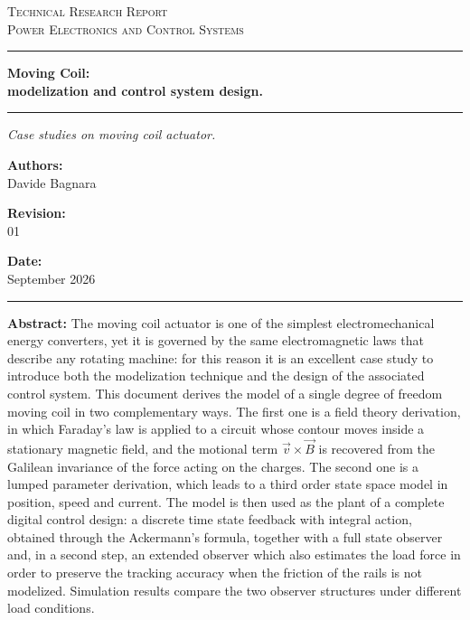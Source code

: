 \documentclass[12pt,a4paper]{scrartcl}
\newcommand{\DocCategory}{Technical Research Report}
\newcommand{\DocField}{Power Electronics and Control Systems}
\newcommand{\DocTitle}{%
	{\fontsize{20}{24}\selectfont\bfseries Moving Coil:} \\[16pt]
	{\fontsize{16}{20}\selectfont\bfseries modelization and control system design.}
}
\newcommand{\DocSubtitle}{%
	Case studies on moving coil actuator.
}
\newcommand{\DocAuthor}{Davide Bagnara}
\newcommand{\DocRevision}{01}
\newcommand{\DocDate}{September 2026}
\newcommand{\DocAbstract}{%
	The moving coil actuator is one of the simplest electromechanical energy converters, yet it is governed by the same electromagnetic laws that describe any rotating machine: for this reason it is an excellent case study to introduce both the modelization technique and the design of the associated control system. This document derives the model of a single degree of freedom moving coil in two complementary ways. The first one is a field theory derivation, in which Faraday's law is applied to a circuit whose contour moves inside a stationary magnetic field, and the motional term $\vec{v}\times\vec{B}$ is recovered from the Galilean invariance of the force acting on the charges. The second one is a lumped parameter derivation, which leads to a third order state space model in position, speed and current. The model is then used as the plant of a complete digital control design: a discrete time state feedback with integral action, obtained through the Ackermann's formula, together with a full state observer and, in a second step, an extended observer which also estimates the load force in order to preserve the tracking accuracy when the friction of the rails is not modelized. Simulation results compare the two observer structures under different load conditions.
}
\begin{document}
	\titlepage
	\begin{center}
		{\Large\scshape \DocCategory}\\[8pt]
		{\large\scshape \DocField}
	\end{center}

	\vspace{30pt}
	\noindent\rule{\linewidth}{0.8pt}

	\begin{center}
		\DocTitle
	\end{center}

	\vspace{4pt}
	\noindent\rule{\linewidth}{2.2pt}

	\begin{center}
		\begin{onehalfspace}
			{\large\itshape \DocSubtitle}
		\end{onehalfspace}
	\end{center}

	\vspace{30pt}

	\noindent
	\begin{minipage}[t]{0.44\linewidth}
		\textbf{Authors:}\\[2pt]
		\DocAuthor
	\end{minipage}%
	\hfill
	\begin{minipage}[t]{0.22\linewidth}
		\centering
		\textbf{Revision:}\\[2pt]
		\DocRevision
	\end{minipage}%
	\hfill
	\begin{minipage}[t]{0.30\linewidth}
		\raggedleft
		\textbf{Date:}\\[2pt]
		\DocDate
	\end{minipage}

	\vspace{10pt}
	\noindent\rule{\linewidth}{0.8pt}

	\vspace{24pt}

	\begin{center}
		\begin{minipage}{0.88\linewidth}
			\footnotesize
			\begin{onehalfspace}
				\textbf{Abstract:} \DocAbstract
			\end{onehalfspace}
		\end{minipage}
	\end{center}
\end{document}
